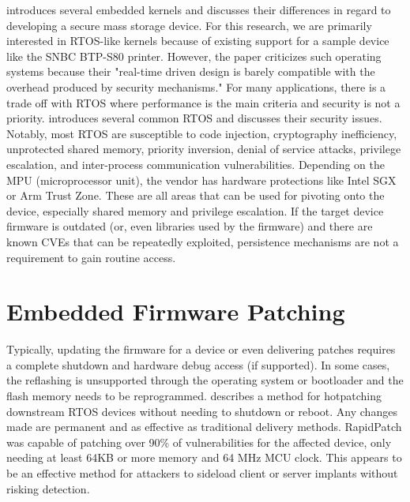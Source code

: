 
\autocite{Benadjila2018WooKeyU} introduces several embedded kernels and discusses their differences in regard to developing a secure mass storage device. For this research, we are primarily interested in RTOS-like kernels because of existing support for a sample device like the SNBC BTP-S80 printer. However, the paper criticizes such operating systems because their "real-time driven design is barely compatible with the overhead produced by security mechanisms." For many applications, there is a trade off with RTOS where performance is the main criteria and security is not a priority. \autocite{yuRealTimeOperatingSystem} introduces several common RTOS and discusses their security issues. Notably, most RTOS are susceptible to code injection, cryptography inefficiency, unprotected shared memory, priority inversion, denial of service attacks, privilege escalation, and inter-process communication vulnerabilities. Depending on the MPU (microprocessor unit), the vendor has hardware protections like Intel SGX or Arm Trust Zone. These are all areas that can be used for pivoting onto the device, especially shared memory and privilege escalation. If the target device firmware is outdated (or, even libraries used by the firmware) and there are known CVEs that can be repeatedly exploited, persistence mechanisms are not a requirement to gain routine access.

\section{Embedded Firmware Patching}


Typically, updating the firmware for a device or even delivering patches requires a complete shutdown and hardware debug access (if supported). In some cases, the reflashing is unsupported through the operating system or bootloader and the flash memory needs to be reprogrammed. \autocite{heRapidPatchFirmwareHotpatching2022} describes a method for hotpatching downstream RTOS devices without needing to shutdown or reboot. Any changes made are permanent and as effective as traditional delivery methods. RapidPatch was capable of patching over 90\% of vulnerabilities for the affected device, only needing at least 64KB or more memory and 64 MHz MCU clock. This appears to be an effective method for attackers to sideload client or server implants without risking detection. 

